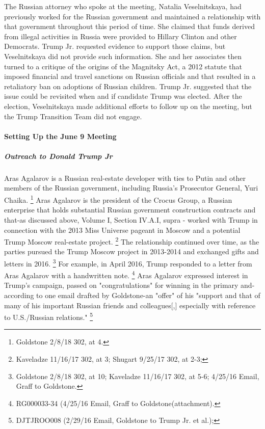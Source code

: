 The Russian attorney who spoke at the meeting, Natalia Veselnitskaya, had previously worked for the Russian government and maintained a relationship with that government throughout this period of time.
She claimed that funds derived from illegal activities in Russia were provided to Hillary Clinton and other Democrats.
Trump Jr. requested evidence to support those claims, but Veselnitskaya did not provide such information.
She and her associates then turned to a critique of the origins of the Magnitsky Act, a 2012 statute that imposed financial and travel sanctions on Russian officials and that resulted in a retaliatory ban on adoptions of Russian children.
Trump Jr. suggested that the issue could be revisited when and if candidate Trump was elected.
After the election, Veselnitskaya made additional efforts to follow up on the meeting, but the Trump Transition Team did not engage.

\paragraph{Setting Up the June 9 Meeting}

\subparagraph{Outreach to Donald Trump Jr}

Aras Agalarov is a Russian real-estate developer with ties to Putin and other members of the Russian government, including Russia's Prosecutor General, Yuri Chaika.%
\footnote{ Goldstone 2/8/18 302, at 4.}
Aras Agalarov is the president of the Crocus Group, a Russian enterprise that holds substantial Russian government construction contracts and that-as discussed above, Volume I, Section IV.A.I, supra - worked with Trump in connection with the 2013 Miss Universe pageant in Moscow and a potential Trump Moscow real-estate project.%
\footnote{ Kaveladze 11/16/17 302, at 3;
Shugart 9/25/17 302, at 2-3;
}
The relationship continued over time, as the parties pursued the Trump Moscow project in 2013-2014 and exchanged gifts and letters in 2016.%
\footnote{ Goldstone 2/8/18 302, at 10;
 Kaveladze 11/16/17 302, at 5-6; 
4/25/16 Email, Graff to Goldstone.}
For example, in April 2016, Trump responded to a letter from Aras Agalarov with a handwritten note.%
\footnote{RG000033-34 (4/25/16 Email, Graff to Goldstone(attachment).}
Aras Agalarov expressed interest in Trump's campaign, passed on "congratulations" for winning in the primary and-according to one email drafted by Goldstone-an "offer" of his "support and that of many of his important Russian friends and colleagues[,] especially with reference to U.S./Russian relations."%
\footnote{DJTJROO008 (2/29/16 Email, Goldstone to Trump Jr. et al.);
}

